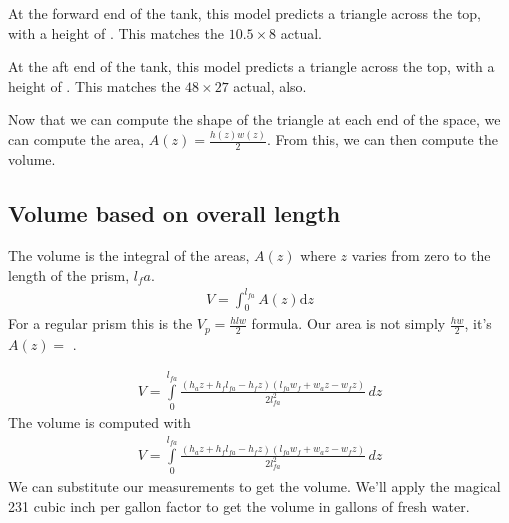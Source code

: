 \documentclass[letterpaper,10pt,english]{sphinxmanual}
\begin{document}
\sphinxAtStartPar
At the forward end of the tank, this model predicts a triangle  across the top,
with a height of . This matches the \(10.5 \times 8\) actual.

\sphinxAtStartPar
At the aft end of the tank, this model predicts a triangle  across the top,
with a height of . This matches the \(48 \times 27\) actual, also.

\sphinxAtStartPar
Now that we can compute the shape of the triangle at each end of the space, we can compute the area, \(A(z) = \frac{h(z) w(z)}{2}\). From this, we can then compute the volume.


\subsection{Volume based on overall length}
\label{\detokenize{prism-irregular:volume-based-on-overall-length}}
\sphinxAtStartPar
The volume is the integral of the areas, \(A(z)\) where \(z\) varies from zero to the length of the prism, \(l_fa\).
\begin{equation*}
\begin{split}
V = \int_{0}^{l_{fa}} A(z) \text{d}z
\end{split}
\end{equation*}
\sphinxAtStartPar
For a regular prism this is the \(V_p = \frac{h l w}{2}\) formula. Our area is not simply \(\frac{hw}{2}\), it’s \(A(z) = \) .

\begin{sphinxVerbatim}[commandchars=\\\{\}]
     
\end{sphinxVerbatim}
\begin{equation*}
\begin{split}\displaystyle V = \int\limits_{0}^{l_{fa}} \frac{\left(h_{a} z + h_{f} l_{fa} - h_{f} z\right) \left(l_{fa} w_{f} + w_{a} z - w_{f} z\right)}{2 l_{fa}^{2}}\, dz\end{split}
\end{equation*}
\sphinxAtStartPar
The volume is computed with
\begin{equation}\label{equation:README:volume}
\begin{split}\displaystyle V = \int\limits_{0}^{l_{fa}} \frac{\left(h_{a} z + h_{f} l_{fa} - h_{f} z\right) \left(l_{fa} w_{f} + w_{a} z - w_{f} z\right)}{2 l_{fa}^{2}}\, dz\end{split}
\end{equation}
\sphinxAtStartPar
We can substitute our measurements to get the volume. We’ll apply the magical 231 cubic inch per gallon factor to get the volume in gallons of fresh water.
\end{document}
